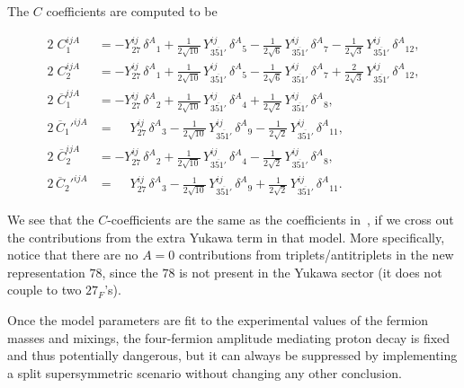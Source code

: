 \documentclass[a4paper,12pt]{article}
\def\yd{Y_{27}}
\def\yt{Y_{\overline{351'}}}
\begin{document}
The $C$ coefficients are computed to be

\begin{align}
2\;C_1^{ijA}&=-\yd^{ij}\,\delta^{A}{}_{1}+\tfrac{1}{2\sqrt{10}}\,\yt^{ij}\,\delta^{A}{}_{5}
-\tfrac{1}{2\sqrt{6}}\,\yt^{ij}\,\delta^{A}{}_{7}-\tfrac{1}{2\sqrt{3}}\,\yt^{ij}\,\delta^{A}{}_{12},\\
2\;C_2^{ijA}&=-\yd^{ij}\,\delta^{A}{}_{1}+\tfrac{1}{2\sqrt{10}}\,\yt^{ij}\,\delta^{A}{}_{5}
-\tfrac{1}{2\sqrt{6}}\,\yt^{ij}\,\delta^{A}{}_{7}+\tfrac{2}{2\sqrt{3}}\,\yt^{ij}\,\delta^{A}{}_{12},\\
2\;\overline{C}_1^{ijA}&=-\yd^{ij}\,\delta^{A}{}_{2}+
\tfrac{1}{2\sqrt{10}}\,\yt^{ij}\,\delta^{A}{}_{4}+\tfrac{1}{2\sqrt{2}}\,\yt^{ij}\,\delta^{A}{}_{8},\\
2\,\overline{C}_1'^{ijA}&=\phantom{-}\yd^{ij}\,\delta^{A}{}_{3}-
\tfrac{1}{2\sqrt{10}}\,\yt^{ij}\,\delta^{A}{}_{9}-\tfrac{1}{2\sqrt{2}}\,\yt^{ij}\,\delta^{A}{}_{11},\\
2\;\overline{C}_2^{ijA}&=-\yd^{ij}\,\delta^{A}{}_{2}+
\tfrac{1}{2\sqrt{10}}\,\yt^{ij}\,\delta^{A}{}_{4}-\tfrac{1}{2\sqrt{2}}\,\yt^{ij}\,\delta^{A}{}_{8},\\
2\,\overline{C}_2'^{ijA}&=\phantom{-}\yd^{ij}\,\delta^{A}{}_{3}-
\tfrac{1}{2\sqrt{10}}\,\yt^{ij}\,\delta^{A}{}_{9}+\tfrac{1}{2\sqrt{2}}\,\yt^{ij}\,\delta^{A}{}_{11}.
\end{align}

We see that the $C$-coefficients are the same as the coefficients in~\cite{Bajc:2013qra}, if we cross out the contributions from the extra Yukawa term in that model. More specifically, notice that there are no $A=0$ contributions from triplets/antitriplets in the new representation $78$, since the $78$ is not present in the Yukawa sector (it does not couple to two $27_F$'s).

Once the model parameters are fit to the experimental values of the fermion masses and mixings, the four-fermion amplitude
mediating proton decay is fixed and thus potentially dangerous, but it can always be suppressed by implementing
a split supersymmetric scenario without changing any other conclusion.
\end{document}
